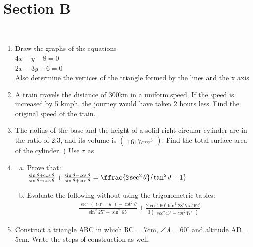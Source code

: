 \documentclass[journal,12pt,twocolumn]{IEEEtran}
\newcommand{\myvec}[1]{\ensuremath{\begin{pmatrix}#1\end{pmatrix}}}
\begin{document}
\begin{enumerate}[label=1.\arabic*]
\vspace{1mm}\\
\section{Section B}
\vspace{3mm}\\
\begin{enumerate}[label=2.\arabic*]
\item Draw the graphs of the equations\\
$ 4x - y - 8 = 0 $\\
$ 2x - 3y + 6 = 0 $\\
Also determine the vertices of the triangle formed by the lines and the
x axis\\

\item A train travels the distance of 300km in a uniform speed. If the speed
is increased by 5 kmph, the journey would have taken 2 hours less. Find the 
original speed of the train.\\
\item The radius of the base and the height of a solid right circular cylinder
are in the ratio of 2:3, and its volume is $\myvec{1617 cm^3}$. Find the total 
surface area of the cylinder. ( Use $\pi$  as %
\item 
\begin{enumerate}[a)] 
    \item  Prove that:\\
     $ \frac{\sin{\theta} + \cos{\theta}}{\sin{\theta} - \cos{\theta}}  + \frac{\sin{\theta} - \cos{\theta}}{\sin{\theta} + \cos{\theta}} = \ffrac{2 \sec^2 \theta}{\tan^2 \theta - 1} $\\
     \item Evaluate the following without using the trigonometric tables:\\
     \begin{align}
     \frac{\sec^2\myvec{90^\circ - \theta} - \cot^2\theta}{\sin^2 25^\circ + \sin^2 65^\circ}
     + \frac{2\cos^2 60^\circ \tan^2 28^\circ tan^2 62^\circ}{3\myvec{sec^2 43^\circ - cot^2 47^\circ}}
     \end{align}
\end{enumerate}

\item Construct a triangle ABC in which BC = 7cm, $\angle{A} = 60^\circ $  and altitude AD = 5cm. Write the steps of construction as well.\\


\end{enumerate}
\end{enumerate}
\end{document}
